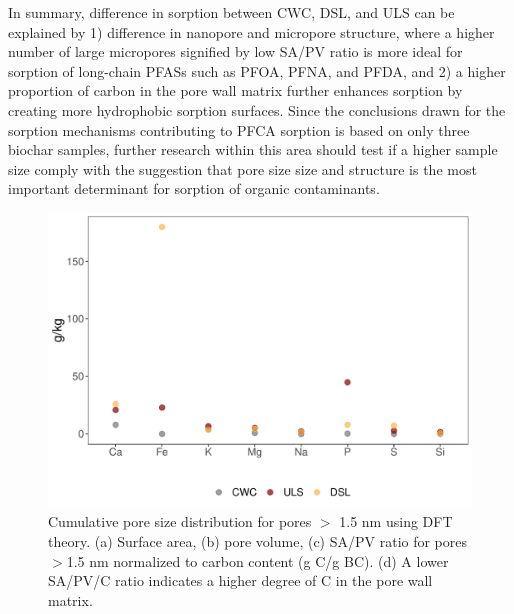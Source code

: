 In summary, difference in sorption between CWC, DSL, and ULS can be explained by 1) difference in nanopore and micropore structure, where a higher number of large micropores signified by low SA/PV ratio is more ideal for sorption of long-chain PFASs such as PFOA, PFNA, and PFDA, and 2) a higher proportion of carbon in the pore wall matrix further enhances sorption by creating more hydrophobic sorption surfaces. Since the conclusions drawn for the sorption mechanisms contributing to PFCA sorption is based on only three biochar samples, further research within this area should test if a higher sample size comply with the suggestion that pore size size and structure is the most important determinant for sorption of organic contaminants. 

\begin{figure}
    \centering
    \includegraphics[width=\textwidth]{R/figs/PZD_SAPV_C_plot.pdf}
    \caption{Cumulative pore size distribution for pores $>$ 1.5 nm using DFT theory. (a) Surface area, (b) pore volume, (c) SA/PV ratio for pores $>$1.5 nm normalized to carbon content (g C/g BC). (d) A lower SA/PV/C ratio indicates a higher degree of C in the pore wall matrix.}
    \label{fig:PZD_large}
\end{figure}


